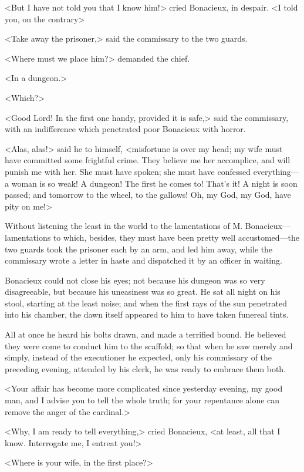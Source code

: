 <But I have not told you that I know him!> cried Bonacieux, in despair. <I told you, on the contrary\longdash> 

<Take away the prisoner,> said the commissary to the two guards. 

<Where must we place him?> demanded the chief. 

<In a dungeon.> 

<Which?> 

<Good Lord! In the first one handy, provided it is safe,> said the commissary, with an indifference which penetrated poor Bonacieux with horror. 

<Alas, alas!> said he to himself, <misfortune is over my head; my wife must have committed some frightful crime. They believe me her accomplice, and will punish me with her. She must have spoken; she must have confessed everything---a woman is so weak! A dungeon! The first he comes to! That's it! A night is soon passed; and tomorrow to the wheel, to the gallows! Oh, my God, my God, have pity on me!> 

Without listening the least in the world to the lamentations of M. Bonacieux---lamentations to which, besides, they must have been pretty well accustomed---the two guards took the prisoner each by an arm, and led him away, while the commissary wrote a letter in haste and dispatched it by an officer in waiting. 

Bonacieux could not close his eyes; not because his dungeon was so very disagreeable, but because his uneasiness was so great. He sat all night on his stool, starting at the least noise; and when the first rays of the sun penetrated into his chamber, the dawn itself appeared to him to have taken funereal tints. 

All at once he heard his bolts drawn, and made a terrified bound. He believed they were come to conduct him to the scaffold; so that when he saw merely and simply, instead of the executioner he expected, only his commissary of the preceding evening, attended by his clerk, he was ready to embrace them both. 

<Your affair has become more complicated since yesterday evening, my good man, and I advise you to tell the whole truth; for your repentance alone can remove the anger of the cardinal.> 

<Why, I am ready to tell everything,> cried Bonacieux, <at least, all that I know. Interrogate me, I entreat you!> 

<Where is your wife, in the first place?> 

